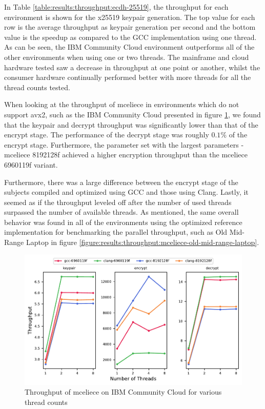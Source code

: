 In Table \ref{table:results:throughput:ecdh-25519}, the throughput for each environment is shown for the \gls{x25519} keypair generation. The top value for each row is the average throughput as keypair generation per second and the bottom value is the speedup as compared to the GCC implementation using one thread. As can be seen, the IBM Community Cloud environment outperforms all of the other environments when using one or two threads. The mainframe and cloud hardware tested saw a decrease in throughput at one point or another, whilst the consumer hardware continually performed better with more threads for all the thread counts tested.



When looking at the throughput of \gls{mceliece} in environments which do not support \gls{avx2}, such as the IBM Community Cloud presented in figure \ref{figure:results:throughput:mceliece-ibm-community-cloud}, we found that the keypair and decrypt throughput was significantly lower than that of the encrypt stage. The performance of the decrypt stage was roughly $0.1\%$ of the encrypt stage. Furthermore, the parameter set with the largest parameters - \gls{mceliece} 8192128f achieved a higher encryption throughput than the \gls{mceliece} 6960119f variant.

Furthermore, there was a large difference between the encrypt stage of the subjects compiled and optimized using GCC and those using Clang. Lastly, it seemed as if the throughput leveled off after the number of used threads surpassed the number of available threads. As mentioned, the same overall behavior was found in all of the environments using the optimized reference implementation for benchmarking the parallel throughput, such as Old Mid-Range Laptop in figure \ref{figure:results:throughput:mceliece-old-mid-range-laptop}.

\begin{figure}
    \centering
    \includegraphics[scale=0.75]{chapters/results/throughput/IBM Community Cloud_mceliece.pdf}
    \caption{Throughput of \gls{mceliece} on IBM Community Cloud for various thread counts}
    \label{figure:results:throughput:mceliece-ibm-community-cloud}
\end{figure} 

